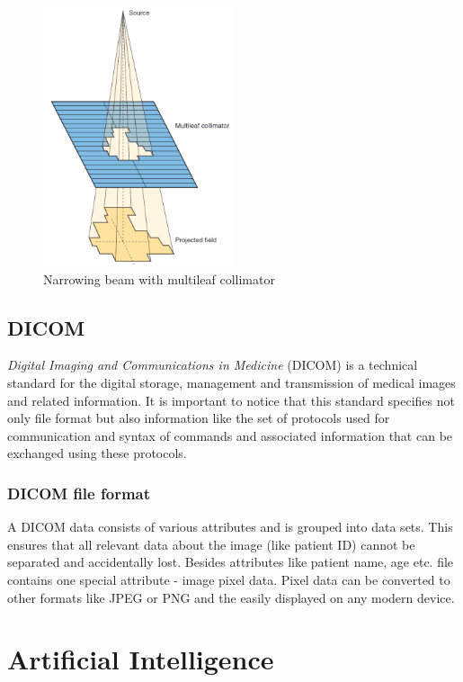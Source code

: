 \begin{figure}[H]
    \centering
    \includegraphics[width=0.5\textwidth]{Content/Images/mlc.png}
    \caption{Narrowing beam with multileaf collimator \cite{abeloff_clinical_oncology}}
\end{figure}

\subsection{DICOM}

\emph{Digital Imaging and Communications in Medicine} (DICOM) is a technical standard for the digital storage, management and transmission of medical images and related information. It is important to notice that this standard specifies not only file format but also information like the set of protocols used for communication and syntax of commands and associated information that can be exchanged using these protocols. \cite{DICOM_spec_intro}

\subsubsection{DICOM file format}

A DICOM data consists of various attributes and is grouped into data sets. This ensures that all relevant data about the image (like patient ID) cannot be separated and accidentally lost. Besides attributes like patient name, age etc. file contains one special attribute - image pixel data. Pixel data can be converted to other formats like JPEG or PNG and the easily displayed on any modern device. \cite{DICOM_spec_file}

\section{Artificial Intelligence}

